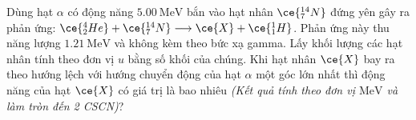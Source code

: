 \begin{ex}
	Dùng hạt $\alpha$ có động năng $\SI{5.00}{\mega\electronvolt}$ bắn vào hạt nhân $\ce{^{14}_7N}$ đứng yên gây ra phản ứng: $\ce{^4_2He}+\ce{^{14}_7N}\longrightarrow\ce{X}+\ce{^1_1H}$. Phản ứng này thu năng lượng $\SI{1.21}{\mega\electronvolt}$ và không kèm theo bức xạ gamma. Lấy khối lượng các hạt nhân tính theo đơn vị $\si{u}$ bằng số khối của chúng. Khi hạt nhân $\ce{X}$ bay ra theo hướng lệch với hướng chuyển động của hạt $\alpha$ một góc lớn nhất thì động năng của hạt $\ce{X}$ có giá trị là bao nhiêu \textit{(Kết quả tính theo đơn vị $\si{\mega\electronvolt}$ và làm tròn đến 2 CSCN)}?
\end{ex}
